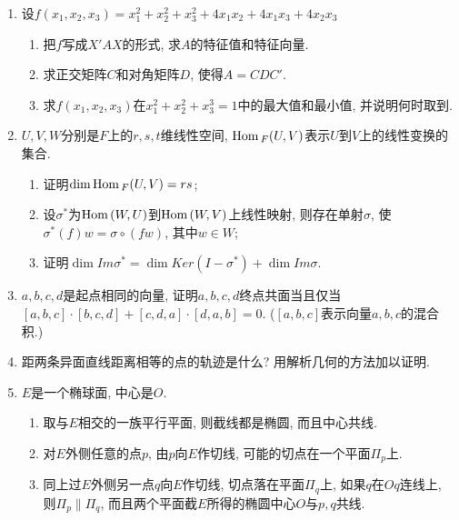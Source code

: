 \documentclass[12pt,a4paper,openany]{book}
\newcommand\Hom{\text{Hom\,}}
\begin{document}
\begin{enumerate}
\item 设$f(x_1, x_2, x_3) = x_1^2 + x_2^2 + x_3^2 + 4x_1x_2 + 4x_1x_3 + 4x_2x_3$
\begin{enumerate}
\item 把$f$写成$X'AX$的形式, 求$A$的特征值和特征向量.
\item 求正交矩阵$C$和对角矩阵$D$, 使得$A = CDC'$.
\item 求$f(x_1, x_2, x_3)$在$x_1^2 + x_2^2 + x_3^3 = 1$中的最大值和最小值, 并说明何时取到.
\end{enumerate}

\item $U,V,W$分别是$F$上的$r, s, t$维线性空间, $\Hom_F(U, V)$表示$U$到$V$上的线性变换的集合.
\begin{enumerate}
\item 证明$\dim{\Hom_F(U, V)} = rs$;
\item 设$\sigma^*$为$\Hom(W, U)$到$\Hom(W, V)$上线性映射, 则存在单射$\sigma$, 使$\sigma^*(f)w = \sigma \circ (fw)$, 其中$w \in W$;
\item 证明$\dim{Im\sigma^*} = \dim{Ker{(I - \sigma^*)}} + \dim{Im\sigma}$.
\end{enumerate}

\item $a, b, c, d$是起点相同的向量, 证明$a, b, c, d$终点共面当且仅当$[a,b,c]\cdot[b,c,d] + [c,d,a]\cdot[d,a,b] = 0$. ($[a, b, c]$表示向量$a, b, c$的混合积.)

\item 距两条异面直线距离相等的点的轨迹是什么? 用解析几何的方法加以证明.

\item $E$是一个椭球面, 中心是$O$.
\begin{enumerate}
\item 取与$E$相交的一族平行平面, 则截线都是椭圆, 而且中心共线.

\item 对$E$外侧任意的点$p$, 由$p$向$E$作切线, 可能的切点在一个平面$\varPi_p$上.

\item 同上过$E$外侧另一点$q$向$E$作切线, 切点落在平面$\varPi_q$上, 如果$q$在$Oq$连线上, 则$\varPi_p \parallel \varPi_q$, 而且两个平面截$E$所得的椭圆中心$O$与$p, q$共线.
\end{enumerate}

\end{enumerate}
\end{document}
